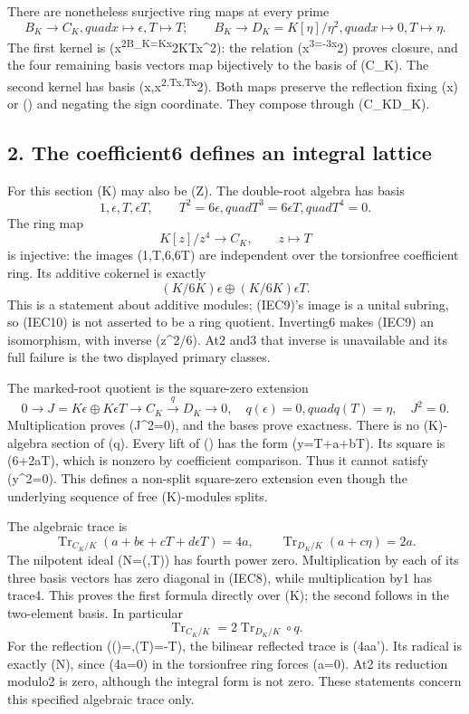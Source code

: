\documentclass[
  10pt,
]{article}
\begin{document}
There are nonetheless surjective ring maps at every prime \[
B_K\longrightarrow C_K,quad x\mapsto\epsilon, T\mapsto T;
\qquad B_K\longrightarrow D_K=K[\eta]/\eta^2,quad x\mapsto0, T\mapsto\eta.
\tag{IEC7}
\] The first kernel is (x\textsuperscript{2B\_K=Kx}2\oplus KTx\^{}2):
the relation (x\textsuperscript{3=-3x}2) proves closure, and the four
remaining basis vectors map bijectively to the basis of (C\_K). The
second kernel has basis (x,x\textsuperscript{2,Tx,Tx}2). Both maps
preserve the reflection fixing (x) or (\epsilon) and negating the sign
coordinate. They compose through (C\_K\to D\_K).

\subsection{2. The coefficient6 defines an integral
lattice}\label{the-coefficient6-defines-an-integral-lattice}

For this section (K) may also be (\mathbb Z). The double-root algebra
has basis \[
1,\epsilon,T,\epsilon T,\qquad T^2=6\epsilon,quad T^3=6\epsilon T,quad T^4=0.
\tag{IEC8}
\] The ring map \[
K[z]/z^4\longrightarrow C_K,\qquad z\longmapsto T
\tag{IEC9}
\] is injective: the images (1,T,6\epsilon,6\epsilon T) are independent
over the torsionfree coefficient ring. Its additive cokernel is exactly
\[
(K/6K)\epsilon\oplus(K/6K)\epsilon T.
\tag{IEC10}
\] This is a statement about additive modules; (IEC9)'s image is a
unital subring, so (IEC10) is not asserted to be a ring quotient.
Inverting6 makes (IEC9) an isomorphism, with inverse
(\epsilon\mapsto z\^{}2/6). At2 and3 that inverse is unavailable and its
full failure is the two displayed primary classes.

The marked-root quotient is the square-zero extension \[
0\longrightarrow J=K\epsilon\oplus K\epsilon T
\longrightarrow C_K\xrightarrow{q}D_K\longrightarrow0,
\quad q(\epsilon)=0,quad q(T)=\eta,\quad J^2=0.
\tag{IEC11}
\] Multiplication proves (J\^{}2=0), and the bases prove exactness.
There is no (K)-algebra section of (q). Every lift of (\eta) has the
form (y=T+a\epsilon+b\epsilon T). Its square is
(6\epsilon+2a\epsilon T), which is nonzero by coefficient comparison.
Thus it cannot satisfy (y\^{}2=0). This defines a non-split square-zero
extension even though the underlying sequence of free (K)-modules
splits.

The algebraic trace is \[
\operatorname{Tr}_{C_K/K}(a+b\epsilon+cT+d\epsilon T)=4a,
\qquad\operatorname{Tr}_{D_K/K}(a+c\eta)=2a.
\tag{IEC12}
\] The nilpotent ideal (N=(\epsilon,T)) has fourth power zero.
Multiplication by each of its three basis vectors has zero diagonal in
(IEC8), while multiplication by1 has trace4. This proves the first
formula directly over (K); the second follows in the two-element basis.
In particular \[
\operatorname{Tr}_{C_K/K}=2\operatorname{Tr}_{D_K/K}\circ q.
\tag{IEC13}
\] For the reflection (\sigma(\epsilon)=\epsilon,\sigma(T)=-T), the
bilinear reflected trace is (4aa'). Its radical is exactly (N), since
(4a=0) in the torsionfree ring forces (a=0). At2 its reduction modulo2
is zero, although the integral form is not zero. These statements
concern this specified algebraic trace only.
\end{document}
